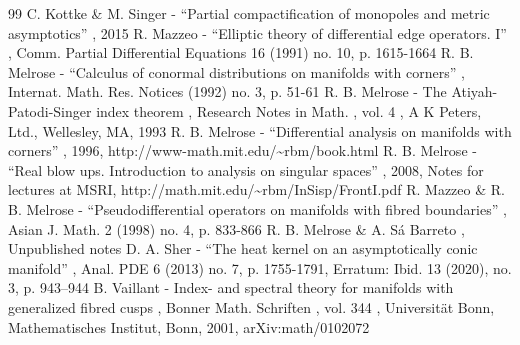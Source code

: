 \documentclass[11pt]{article}
\numberwithin{equation}{section}
\theoremstyle{plain}
\theoremstyle{definition}
\begin{document}
\begin{thebibliography}{99}
 C. Kottke \& M. Singer - “Partial compactification of monopoles and metric asymptotics” , 2015
 R. Mazzeo - “Elliptic theory of differential edge operators. I” , Comm. Partial Differential Equations 16 (1991) no. 10, p. 1615-1664
 R. B. Melrose - “Calculus of conormal distributions on manifolds with corners” , Internat. Math. Res. Notices (1992) no. 3, p. 51-61
 R. B. Melrose - The Atiyah-Patodi-Singer index theorem , Research Notes in Math. , vol. 4 , A K Peters, Ltd., Wellesley, MA, 1993
 R. B. Melrose - “Differential analysis on manifolds with corners” , 1996, http://www-math.mit.edu/\textasciitilde{}rbm/book.html
 R. B. Melrose - “Real blow ups. Introduction to analysis on singular spaces” , 2008, Notes for lectures at MSRI, http://math.mit.edu/\textasciitilde{}rbm/InSisp/FrontI.pdf
 R. Mazzeo \& R. B. Melrose - “Pseudodifferential operators on manifolds with fibred boundaries” , Asian J. Math. 2 (1998) no. 4, p. 833-866
 R. B. Melrose \& A. Sá Barreto , Unpublished notes
 D. A. Sher - “The heat kernel on an asymptotically conic manifold” , Anal. PDE 6 (2013) no. 7, p. 1755-1791, Erratum: Ibid. 13 (2020), no. 3, p. 943–944
 B. Vaillant - Index- and spectral theory for manifolds with generalized fibred cusps , Bonner Math. Schriften , vol. 344 , Universität Bonn, Mathematisches Institut, Bonn, 2001, arXiv:math/0102072
\end{thebibliography}
\end{document}
